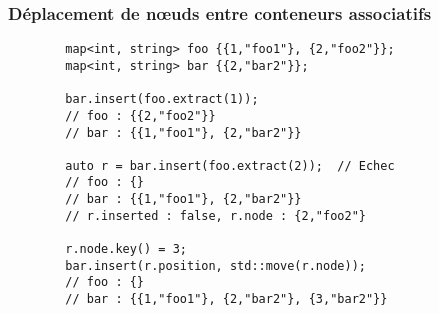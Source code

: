 \documentclass[C++.tex]{subfiles}
\begin{document}
\begin{frame}[fragile]
	\frametitle{Déplacement de nœuds entre conteneurs associatifs}
	\begin{verbatim}
		map<int, string> foo {{1,"foo1"}, {2,"foo2"}};
		map<int, string> bar {{2,"bar2"}};

		bar.insert(foo.extract(1));
		// foo : {{2,"foo2"}}
		// bar : {{1,"foo1"}, {2,"bar2"}}

		auto r = bar.insert(foo.extract(2));  // Echec
		// foo : {}
		// bar : {{1,"foo1"}, {2,"bar2"}}
		// r.inserted : false, r.node : {2,"foo2"}

		r.node.key() = 3;
		bar.insert(r.position, std::move(r.node));
		// foo : {}
		// bar : {{1,"foo1"}, {2,"bar2"}, {3,"bar2"}}
	\end{verbatim}


\end{frame}
\end{document}
